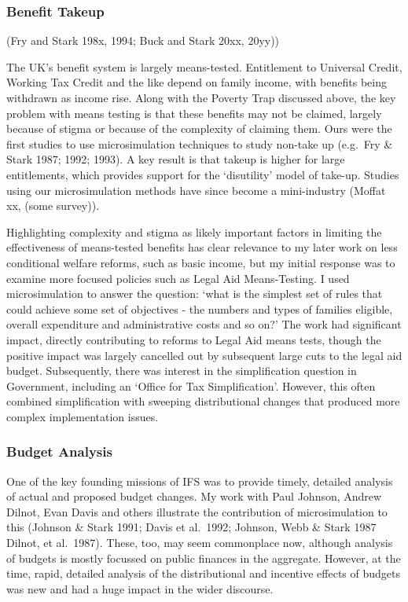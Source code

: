 \documentclass[
  letterpaper,
  DIV=11,
  numbers=noendperiod]{scrartcl}
\begin{document}
\subsubsection{Benefit Takeup}\label{benefit-takeup}

(Fry and Stark 198x, 1994; Buck and Stark 20xx, 20yy))

The UK's benefit system is largely means-tested. Entitlement to
Universal Credit, Working Tax Credit and the like depend on family
income, with benefits being withdrawn as income rise. Along with the
Poverty Trap discussed above, the key problem with means testing is that
these benefits may not be claimed, largely because of stigma or because
of the complexity of claiming them. Ours were the first studies to use
microsimulation techniques to study non-take up (e.g.~Fry \& Stark 1987;
1992; 1993). A key result is that takeup is higher for large
entitlements, which provides support for the `disutility' model of
take-up. Studies using our microsimulation methods have since become a
mini-industry (Moffat xx, (some survey)).

Highlighting complexity and stigma as likely important factors in
limiting the effectiveness of means-tested benefits has clear relevance
to my later work on less conditional welfare reforms, such as basic
income, but my initial response was to examine more focused policies
such as Legal Aid Means-Testing. I used microsimulation to answer the
question: `what is the simplest set of rules that could achieve some set
of objectives - the numbers and types of families eligible, overall
expenditure and administrative costs and so on?' The work had
significant impact, directly contributing to reforms to Legal Aid means
tests, though the positive impact was largely cancelled out by
subsequent large cuts to the legal aid budget. Subsequently, there was
interest in the simplification question in Government, including an
`Office for Tax Simplification'. However, this often combined
simplification with sweeping distributional changes that produced more
complex implementation issues.

\subsubsection{Budget Analysis}\label{budget-analysis}

One of the key founding missions of IFS was to provide timely, detailed
analysis of actual and proposed budget changes. My work with Paul
Johnson, Andrew Dilnot, Evan Davis and others illustrate the
contribution of microsimulation to this (Johnson \& Stark 1991; Davis et
al.~1992; Johnson, Webb \& Stark 1987 Dilnot, et al.~1987). These, too,
may seem commonplace now, although analysis of budgets is mostly
focussed on public finances in the aggregate. However, at the time,
rapid, detailed analysis of the distributional and incentive effects of
budgets was new and had a huge impact in the wider discourse.
\end{document}
